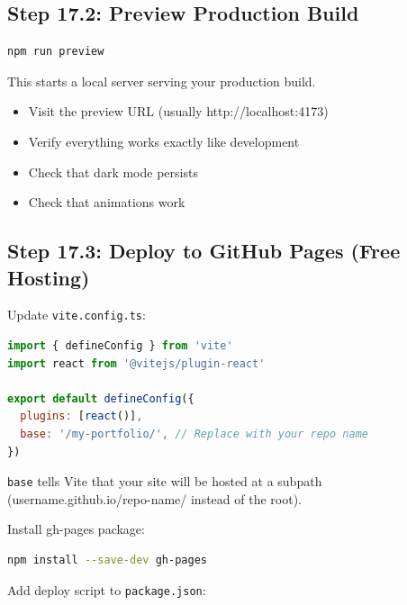 \documentclass[12pt,a4paper]{article}
\begin{document}
\subsection{Step 17.2: Preview Production Build}

\begin{lstlisting}[language=bash,caption={Preview production build}]
npm run preview
\end{lstlisting}

This starts a local server serving your production build.

\begin{checkpoint}
\begin{itemize}
    \item[$\square$] Visit the preview URL (usually http://localhost:4173)
    \item[$\square$] Verify everything works exactly like development
    \item[$\square$] Check that dark mode persists
    \item[$\square$] Check that animations work
\end{itemize}
\end{checkpoint}

\subsection{Step 17.3: Deploy to GitHub Pages (Free Hosting)}

Update \texttt{vite.config.ts}:

\begin{lstlisting}[language=JavaScript,caption={vite.config.ts for GitHub Pages}]
import { defineConfig } from 'vite'
import react from '@vitejs/plugin-react'

export default defineConfig({
  plugins: [react()],
  base: '/my-portfolio/', // Replace with your repo name
})
\end{lstlisting}

\begin{explanation}
\texttt{base} tells Vite that your site will be hosted at a subpath (username.github.io/repo-name/ instead of the root).
\end{explanation}

Install gh-pages package:

\begin{lstlisting}[language=bash]
npm install --save-dev gh-pages
\end{lstlisting}

Add deploy script to \texttt{package.json}:
\end{document}
